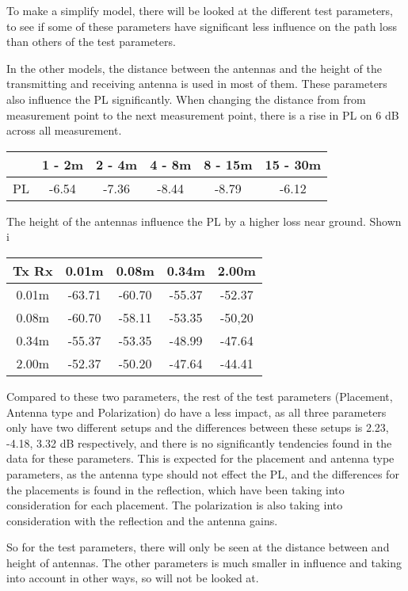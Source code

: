 To make a simplify model, there will be looked at the different test parameters, to see if some of these parameters have significant less influence on the path loss than others of the test parameters.

In the other models, the distance between the antennas and the height of the transmitting and receiving antenna is used in most of them. These parameters also influence the PL significantly. When changing the distance from from measurement point to the next measurement point, there is a rise in PL on 6 dB across all measurement.

\begin{tabular}{|c|c|c|c|c|c|}
\hline
   & 1 - 2m & 2 - 4m & 4 - 8m & 8 - 15m & 15 - 30m \\
\hline
PL & -6.54 & -7.36 & -8.44 & -8.79 & -6.12 \\
\hline
\end{tabular}

The height of the antennas influence the PL by a higher loss near ground. Shown i

\begin{tabular}{|c|c|c|c|c|}
\hline
Tx Rx & 0.01m & 0.08m & 0.34m & 2.00m \\
\hline
0.01m & -63.71 & -60.70 & -55.37 & -52.37\\
\hline
0.08m & -60.70 & -58.11 & -53.35 & -50,20\\
\hline
0.34m & -55.37 & -53.35 & -48.99 & -47.64\\
\hline
2.00m & -52.37 & -50.20 & -47.64 & -44.41\\
\hline
\end{tabular}

Compared to these two parameters, the rest of the test parameters (Placement, Antenna type and Polarization) do have a less impact, as all three parameters only have two different setups and the differences between these setups is 2.23, -4.18, 3.32 dB respectively, and there is no significantly tendencies found in the data for these parameters. This is expected for the placement and antenna type parameters, as the antenna type should not effect the PL, and the differences for the placements is found in the reflection, which have been taking into consideration for each placement. The polarization is also taking into consideration with the reflection and the antenna gains.

So for the test parameters, there will only be seen at the distance between and height of antennas. The other parameters is much smaller in influence and taking into account in other ways, so will not be looked at.
